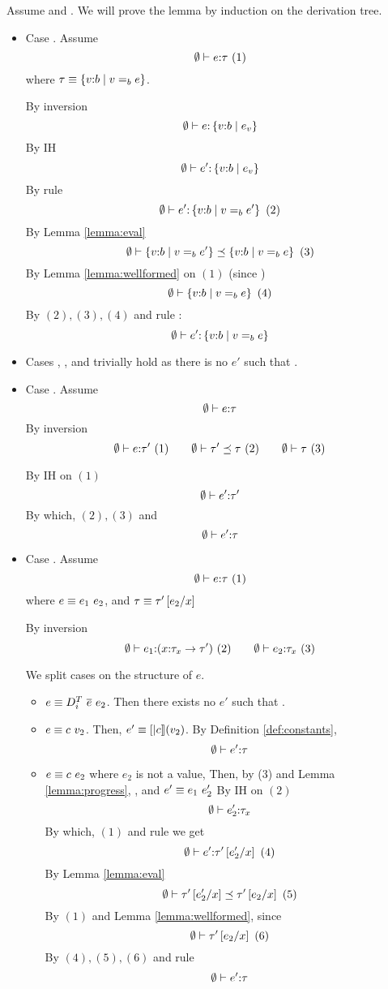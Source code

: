 Assume  and . 
We will prove the lemma by induction on the derivation tree. 
\begin{itemize}
\item Case \rtexact. Assume $$\hastype{\emptyset}{e}{\tau}\ (1)$$
where $\tau \equiv\tref{v}{b}{v \eqb{b} e}$.

By inversion
$$\hastype{\emptyset}{e}{\tref{v}{b}{e_v}}$$
By IH
$$\hastype{\emptyset}{e'}{\tref{v}{b}{e_v}}$$
By rule \rtexact
$$\hastype{\emptyset}{e'}{\tref{v}{b}{v\eqb{b} e'}} \ (2)$$
By Lemma \ref{lemma:eval}
$$\issubtype{\emptyset}{\tref{v}{b}{v\eqb{b} e'}}{\tref{v}{b}{v\eqb{b} e}} \ (3)$$
By Lemma \ref{lemma:wellformed} on $(1)$ (since \iswellformed{}{\emptyset})
$$\iswellformed{\emptyset}{\tref{v}{b}{v\eqb{b} e}} \ (4)$$
By $(2), (3), (4)$ and rule \rtsub:
$$\hastype{\emptyset}{e'}{\tref{v}{b}{v\eqb{b} e}}$$

\item Cases \rtvarbase, \rtvar, \rtconst and \rtfun trivially hold
       as there is no $e'$ such that .

\item Case \rtsub. Assume
$$	\hastype{\emptyset}{e}{\tau}$$
By inversion
$$	\hastype{\emptyset}{e}{\tau'} \ (1) \qquad
	\issubtype{\emptyset}{\tau'}{\tau}\ (2) \qquad
	\iswellformed{\emptyset}{\tau}\ (3)
$$

By IH on $(1)$
$$	\hastype{\emptyset}{e'}{\tau'} $$
By which, $(2), (3)$ and \rtsub
$$	\hastype{\emptyset}{e'}{\tau}$$


\item Case \rtapp. Assume
$$	\hastype{\emptyset}{e}{\tau}\ (1)$$
where $e \equiv \eapp{e_1}{e_2}$, and
	  $\tau\equiv\tau'\sub{x}{e_2}$

By inversion
$$	
	\hastype{\emptyset}{e_1}{(\tfun{x}{\tau_{x}}{\tau'})}\ (2) \qquad
	\hastype{\emptyset}{e_2}{\tau_{x}}\ (3)
$$

We split cases on the structure of $e$.
\begin{itemize}
\item $e\equiv \eapp{\eapp{\dcti}{\overline{e}}}{e_2}$.
Then there exists no $e'$ such that .

\item $e\equiv \eapp{c}{v_2}$.
Then, $e'\equiv\interp{c}(v_2)$.
By Definition \ref{def:constants},
$$\hastype{\emptyset}{e'}{\tau}$$

\item $e\equiv \eapp{c}{e_2}$ where $e_2$ is not a value, 
Then, by (3) and Lemma \ref{lemma:progress},
, and $e' \equiv \eapp{e_1}{e_2'}$
%
By IH on $(2)$
$$	\hastype{\emptyset}{e_2'}{\tau_{x}}$$
By which, $(1)$ and rule \rtapp we get
$$\hastype{\emptyset}{e'}{\tau'\sub{x}{e_2'}}\ (4)$$
By Lemma \ref{lemma:eval}
$$
	\issubtype{\emptyset}{\tau'\sub{x}{e_2'}}{\tau'\sub{x}{e_2}}\ (5)
$$
By $(1)$ and Lemma \ref{lemma:wellformed}, since \iswellformed{}{\emptyset}
$$
	\iswellformed{\emptyset}{\tau'\sub{x}{e_2}}\ (6)
$$
By $(4), (5), (6)$ and rule \rtsub
$$	\hastype{\emptyset}{e'}{\tau}$$


\end{itemize}
\end{itemize}

